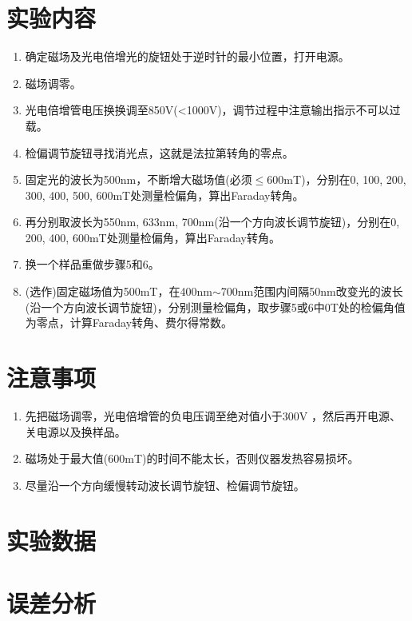 \documentclass[a4paper]{article}
\begin{document}
\section{实验内容}
\begin{enumerate}
\item 确定磁场及光电倍增光的旋钮处于逆时针的最小位置，打开电源。
\item 磁场调零。
\item 光电倍增管电压换换调至850V(<1000V)，调节过程中注意输出指示不可以过载。
\item {}检偏调节旋钮寻找消光点，这就是法拉第转角的零点。
\item 固定光的波长为500nm，不断增大磁场值(必须$\leq$600mT)，分别在0, 100, 200, 300, 400, 500, 600mT处测量检偏角，算出Faraday转角。
\item 再分别取波长为550nm, 633nm, 700nm(沿一个方向波长调节旋钮)，分别在0, 200, 400, 600mT处测量检偏角，算出Faraday转角。
\item 换一个样品重做步骤5和6。
\item (选作)固定磁场值为500mT，在400nm$\sim$700nm范围内间隔50nm改变光的波长(沿一个方向波长调节旋钮)，分别测量检偏角，取步骤5或6中0T处的检偏角值为零点，计算Faraday转角、费尔得常数。
\end{enumerate}

\section{注意事项}
\begin{enumerate}
\item 先把磁场调零，光电倍增管的负电压调至绝对值小于300V ，然后再开电源、关电源以及换样品。
\item 磁场处于最大值(600mT)的时间不能太长，否则仪器发热容易损坏。
\item 尽量沿一个方向缓慢转动波长调节旋钮、检偏调节旋钮。
\end{enumerate}

\section{实验数据}

\section{误差分析}

\end{document}
